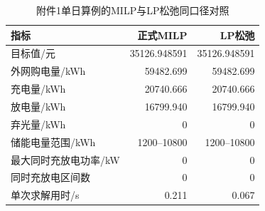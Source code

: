 \begin{table}[H]
\centering\small
\caption{附件1单日算例的MILP与LP松弛同口径对照}
\label{tab:p1-lp-relaxation}
\setlength{\tabcolsep}{7pt}
\begin{tabular}{lrr}
\toprule
指标 & 正式MILP & LP松弛 \\
\midrule
目标值/元 & 35126.948591 & 35126.948591 \\
外网购电量/kWh & 59482.699 & 59482.699 \\
充电量/kWh & 20740.666 & 20740.666 \\
放电量/kWh & 16799.940 & 16799.940 \\
弃光量/kWh & 0 & 0 \\
储能电量范围/kWh & 1200--10800 & 1200--10800 \\
最大同时充放电功率/kW & 0 & 0 \\
同时充放电区间数 & 0 & 0 \\
单次求解用时/s & 0.211 & 0.067 \\
\bottomrule
\end{tabular}
\end{table}
